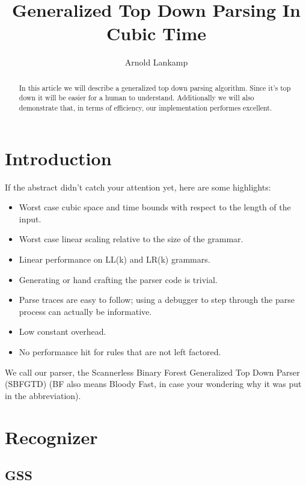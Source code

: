 \documentclass[a4paper,10pt]{article}
\title{Generalized Top Down Parsing In Cubic Time}
\author{Arnold Lankamp}
\begin{document}
\maketitle

\begin{abstract}

In this article we will describe a generalized top down parsing algorithm. Since it's top down it will be easier for a human to understand. Additionally we will also demonstrate that, in terms of efficiency, our implementation performes excellent.

\end{abstract}

\section{Introduction}

If the abstract didn't catch your attention yet, here are some highlights:
\begin{itemize}
 \setlength{\itemsep}{0pt}
 \setlength{\parskip}{0pt}
 \setlength{\parsep}{0pt}

 \item Worst case cubic space and time bounds with respect to the length of the input.
 \item Worst case linear scaling relative to the size of the grammar.
 \item Linear performance on LL(k) and LR(k) grammars.
 \item Generating or hand crafting the parser code is trivial.
 \item Parse traces are easy to follow; using a debugger to step through the parse process can actually be informative.
 \item Low constant overhead.
 \item No performance hit for rules that are not left factored.
\end{itemize}
We call our parser, the Scannerless Binary Forest Generalized Top Down Parser (SBFGTD) (BF also means Bloody Fast, in case your wondering why it was put in the abbreviation).

\section{Recognizer}

\subsection{GSS}
\end{document}
